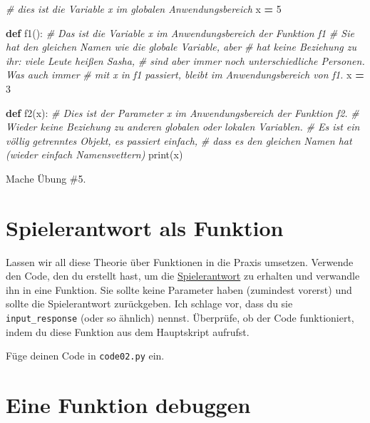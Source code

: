 \documentclass[
]{book}
\newenvironment{Shaded}{\begin{snugshade}}{\end{snugshade}}
\newcommand{\BuiltInTok}[1]{#1}
\newcommand{\CommentTok}[1]{\textcolor[rgb]{0.56,0.35,0.01}{\textit{#1}}}
\newcommand{\DecValTok}[1]{\textcolor[rgb]{0.00,0.00,0.81}{#1}}
\newcommand{\KeywordTok}[1]{\textcolor[rgb]{0.13,0.29,0.53}{\textbf{#1}}}
\newcommand{\NormalTok}[1]{#1}
\newcommand{\OperatorTok}[1]{\textcolor[rgb]{0.81,0.36,0.00}{\textbf{#1}}}
\begin{document}
\begin{Shaded}
\begin{Highlighting}[]
\CommentTok{\# dies ist die Variable \textasciigrave{}x\textasciigrave{} im globalen Anwendungsbereich}
\NormalTok{x  }\OperatorTok{=} \DecValTok{5} 

\KeywordTok{def}\NormalTok{ f1():}
  \CommentTok{\# Das ist die Variable \textasciigrave{}x\textasciigrave{} im Anwendungsbereich der Funktion f1}
  \CommentTok{\# Sie hat den gleichen Namen wie die globale Variable, aber}
  \CommentTok{\# hat keine Beziehung zu ihr: viele Leute heißen Sasha, }
  \CommentTok{\# sind aber immer noch unterschiedliche Personen. Was auch immer}
  \CommentTok{\# mit \textasciigrave{}x\textasciigrave{} in f1 passiert, bleibt im Anwendungsbereich von f1.}
\NormalTok{  x }\OperatorTok{=} \DecValTok{3}

  
\KeywordTok{def}\NormalTok{ f2(x):}
  \CommentTok{\# Dies ist der Parameter \textasciigrave{}x\textasciigrave{} im Anwendungsbereich der Funktion f2.}
  \CommentTok{\# Wieder keine Beziehung zu anderen globalen oder lokalen Variablen.}
  \CommentTok{\# Es ist ein völlig getrenntes Objekt, es passiert einfach, }
  \CommentTok{\# dass es den gleichen Namen hat (wieder einfach Namensvettern)}
  \BuiltInTok{print}\NormalTok{(x)}
\end{Highlighting}
\end{Shaded}

Mache Übung \#5.

\hypertarget{spielerantwort-als-funktion}{%
\section{Spielerantwort als Funktion}\label{spielerantwort-als-funktion}}

Lassen wir all diese Theorie über Funktionen in die Praxis umsetzen. Verwende den Code, den du erstellt hast, um die \protect\hyperlink{guess-the-number-players-response}{Spielerantwort} zu erhalten und verwandle ihn in eine Funktion. Sie sollte keine Parameter haben (zumindest vorerst) und sollte die Spielerantwort zurückgeben. Ich schlage vor, dass du sie \texttt{input\_response} (oder so ähnlich) nennst. Überprüfe, ob der Code funktioniert, indem du diese Funktion aus dem Hauptskript aufrufst.

Füge deinen Code in \texttt{code02.py} ein.

\hypertarget{eine-funktion-debuggen}{%
\section{Eine Funktion debuggen}\label{eine-funktion-debuggen}}
\end{document}
